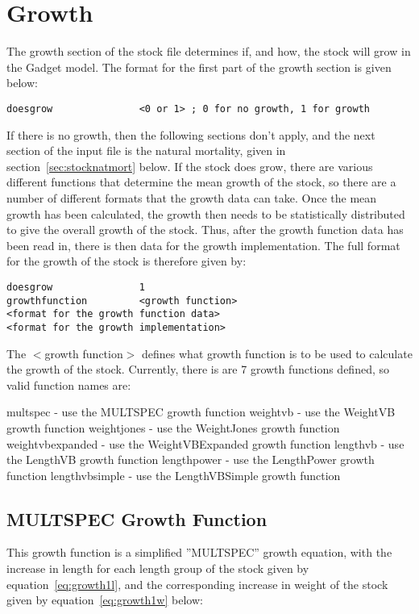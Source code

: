 \documentclass [a4paper, 10pt]{book}
\begin{document}
\section{Growth}\label{sec:stockgrowth}
The growth section of the stock file determines if, and how, the stock will grow in the Gadget model.  The format for the first part of the growth section is given below:

{\small\begin{verbatim}
doesgrow               <0 or 1> ; 0 for no growth, 1 for growth
\end{verbatim}}

If there is no growth, then the following sections don't apply, and the next section of the input file is the natural mortality, given in section~\ref{sec:stocknatmort} below.  If the stock does grow, there are various different functions that determine the mean growth of the stock, so there are a number of different formats that the growth data can take.  Once the mean growth has been calculated, the growth then needs to be statistically distributed to give the overall growth of the stock.  Thus, after the growth function data has been read in, there is then data for the growth implementation.  The full format for the growth of the stock is therefore given by:

{\small\begin{verbatim}
doesgrow               1
growthfunction         <growth function>
<format for the growth function data>
<format for the growth implementation>
\end{verbatim}}

The $<$growth function$>$ defines what growth function is to be used to calculate the growth of the stock.  Currently, there is are 7 growth functions defined, so valid function names are:

\bigskip
multspec - use the MULTSPEC growth function\newline
weightvb - use the WeightVB growth function\newline
weightjones - use the WeightJones growth function\newline
weightvbexpanded - use the WeightVBExpanded growth function\newline
lengthvb - use the LengthVB growth function\newline
lengthpower - use the LengthPower growth function\newline
lengthvbsimple - use the LengthVBSimple growth function

\subsection{MULTSPEC Growth Function}\label{subsec:growth1}
This growth function is a simplified ''MULTSPEC'' growth equation\footnotemark, with the increase in length for each length group of the stock given by equation~\ref{eq:growth1l}, and the corresponding increase in weight of the stock given by equation~\ref{eq:growth1w} below:
\end{document}
